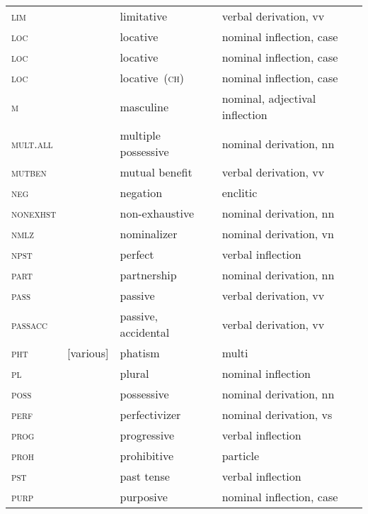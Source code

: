 \begin{refsection}
\begin{small}
\begin{longtable}{*{4}{@{\hspace{1ex}}l}@{\hspace{1ex}}}
\textsc{lim} 	& 	& limitative 				& verbal derivation, vv\\
\textsc{loc} 	&  	& locative 				& nominal inflection, case\\
\textsc{loc} 	&  	& locative 				& nominal inflection, case\\
\textsc{loc} 	&  	& locative~(\textsc{ch}) 		& nominal inflection, case\\
\textsc{m}		&  	& masculine 				& nominal, adjectival inflection\\
\textsc{mult.all}	&  	& multiple possessive 			& nominal derivation, nn\\
\textsc{mutben}		& 		& mutual benefit 			& verbal derivation, vv\\
\textsc{neg} 		&  	& negation 				& enclitic\\
\textsc{nonexhst}&  & non-exhaustive 			& nominal derivation, nn\\
\textsc{nmlz} 		&  	& nominalizer 				& nominal derivation, vn\\
\textsc{npst}	 	&  	& perfect 				& verbal inflection \\
\textsc{part} 		&  	& partnership 				& nominal derivation, nn\\
\textsc{pass} 		&  	& passive 				& verbal derivation, vv\\
\textsc{passacc}&  		& passive, accidental 			& verbal derivation, vv\\
\textsc{pht} 		& [various] 		& phatism 				& multi\\
\textsc{pl} 	& 		& plural 				& nominal inflection\\
\textsc{poss} 		&  		& possessive 				& nominal derivation, nn\\
\textsc{perf} 	&  	& perfectivizer				& nominal derivation, vs\\
\textsc{prog} 		&  	& progressive 				& verbal inflection \\
\textsc{proh} 		&  		& prohibitive 				& particle\\
\textsc{pst} 		&  		& past tense 				& verbal inflection\\
\textsc{purp} 		&  	& purposive 				& nominal inflection, case\\

\end{longtable}
\end{small}
\end{refsection}
